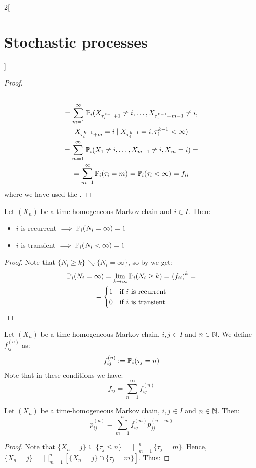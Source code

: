 \documentclass[../../../main_math.tex]{subfiles}
\begin{document}
\begin{multicols}{2}[\section{Stochastic processes}]
\begin{proof}
\begin{multline*}
      \\=\sum_{m=1}^{\infty}\mathbb{P}_i( X_{\tau_i^{k-1}+1}\ne i,\ldots,X_{\tau_i^{k-1}+m-1}\ne i,\\X_{\tau_i^{k-1}+m}=i\mid X_{\tau_i^{k-1}}=i,\tau_i^{k-1}<\infty)
      \\=\sum_{m=1}^{\infty}\mathbb{P}_i( X_{1}\ne i,\ldots,X_{m-1}\ne i,X_{m}=i)=\\=\sum_{m=1}^{\infty}\mathbb{P}_i(\tau_i=m)=\mathbb{P}_i(\tau_i<\infty)=f_{ii}
    \end{multline*}
    where we have used the .
  \end{proof}
  \begin{theorem}
    Let $(X_n)$ be a time-homogeneous Markov chain and $i\in I$. Then:
    \begin{itemize}
      \item $i$ is recurrent $\implies\mathbb{P}_i(N_i=\infty)=1$
      \item $i$ is transient $\implies\mathbb{P}_i(N_i<\infty)=1$
    \end{itemize}
  \end{theorem}
  \begin{proof}
    Note that $\{N_i\geq k\}\searrow\{N_i=\infty\}$, so by  we get:
    \begin{multline*}
      \mathbb{P}_i(N_i=\infty)=\lim_{k\to\infty}\mathbb{P}_i(N_i\geq k)={(f_{ii})}^k=\\=\begin{cases}
        1 & \text{if }i\text{ is recurrent} \\
        0 & \text{if }i\text{ is transient}
      \end{cases}
    \end{multline*}
  \end{proof}
  \begin{definition}
    Let $(X_n)$ be a time-homogeneous Markov chain, $i, j\in I$ and $n\in\mathbb{N}$. We define $f_{ij}^{(n)}$ as:
    $$f_{ij}^{(n)}:=\mathbb{P}_i(\tau_j=n)$$
    Note that in these conditions we have:
    $$
      f_{ij}=\sum_{n=1}^{\infty}f_{ij}^{(n)}
    $$
  \end{definition}
  \begin{proposition}\label{SP:pij-fij}
    Let $(X_n)$ be a time-homogeneous Markov chain, $i, j\in I$ and $n\in\mathbb{N}$. Then:
    $$
      p_{ij}^{(n)}=\sum_{m=1}^{n} f_{ij}^{(m)}p_{jj}^{(n-m)}
    $$
  \end{proposition}
  \begin{proof}
    Note that $\{X_n=j\}\subseteq \{\tau_j\leq n\}=\bigsqcup_{m=1}^n\{\tau_j=m\}$. Hence, $\{X_n=j\}=\bigsqcup_{m=1}^n[\{X_n=j\}\cap \{\tau_j=m\}]$. Thus:

\end{proof}
\end{multicols}
\end{document}
